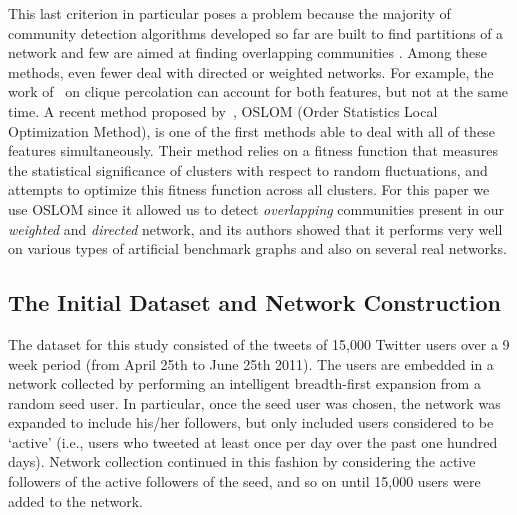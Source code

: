 This last criterion in particular poses a problem because the majority of community detection algorithms developed so far are built to find partitions of a network and few are aimed at finding overlapping communities \cite{BaumesGKMP05,PalEtAl05,ZhaWanZha07,Gre07,PhysRevE.77.016107,Lancichinetti2009,PhysRevE.80.016105,Kovacs2010}. Among these methods, even fewer deal with directed or weighted networks. For example, the work of~\cite{PalEtAl05} on clique percolation can account for both features, but not at the same time. A recent method proposed by~\cite{LancichinettiPlos}, OSLOM (Order Statistics Local Optimization Method), is one of the first methods  able to deal with all of these features simultaneously. Their method relies on a fitness function that measures the statistical significance of clusters with respect to random fluctuations, and attempts to optimize this fitness function across all clusters. For this paper we use OSLOM since it allowed us to detect \emph{overlapping} communities present in our \emph{weighted} and \emph{directed} network, and its authors showed that it performs very well on various types of artificial benchmark graphs and also on several real networks.

\subsection{The Initial Dataset and Network Construction}

The dataset for this study consisted of the tweets of 15,000 Twitter users over a 9 week period (from April 25th to June 25th 2011). The users are embedded in a network collected by performing an intelligent breadth-first expansion from a random seed user. In particular, once the seed user was chosen, the network was expanded to include his/her followers, but only included users considered to be `active' (i.e., users who tweeted at least once per day over the past one hundred days). Network collection continued in this fashion by considering the active followers of the active followers of the seed, and so on until 15,000 users were added to the network.


